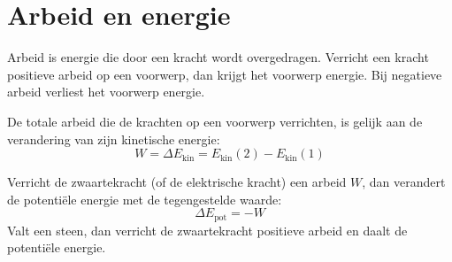 \documentclass{ximera}
\begin{document}
\section{Arbeid en energie}\label{sec:arbeid_energie}
Arbeid is energie die door een kracht wordt overgedragen. Verricht een kracht positieve arbeid op een voorwerp, dan krijgt het voorwerp energie. Bij negatieve arbeid verliest het voorwerp energie.

\begin{proposition}[title={Arbeid-energiestelling}]\nl
    De totale arbeid die de krachten op een voorwerp verrichten, is gelijk aan de verandering van zijn kinetische energie:
    \begin{equation}\label{eq:arbeid_energiestelling}
        W = \Delta E_{\text{kin}} = E_{\text{kin}}(2) - E_{\text{kin}}(1)
    \end{equation}
\end{proposition}

\begin{proposition}[title={Arbeid en potentiële energie}]\nl
    Verricht de zwaartekracht (of de elektrische kracht) een arbeid $W$, dan verandert de potentiële energie met de tegengestelde waarde:
    \begin{equation}\label{eq:arbeid_epot}
        \Delta E_{\text{pot}} = -W
    \end{equation}
    Valt een steen, dan verricht de zwaartekracht positieve arbeid en daalt de potentiële energie.
\end{proposition}
\end{document}
